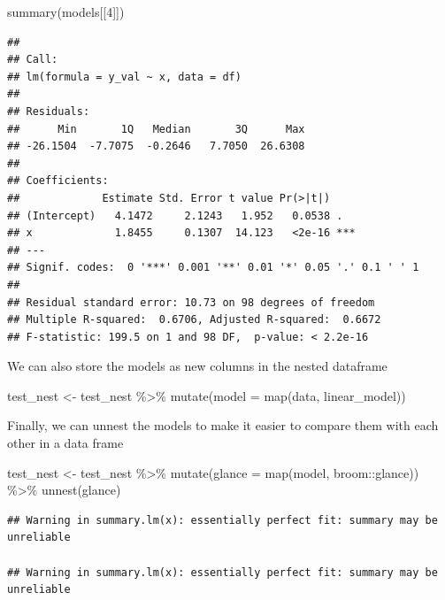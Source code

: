 \documentclass[
]{book}
\newenvironment{Shaded}{\begin{snugshade}}{\end{snugshade}}
\newcommand{\AttributeTok}[1]{\textcolor[rgb]{0.77,0.63,0.00}{#1}}
\newcommand{\DecValTok}[1]{\textcolor[rgb]{0.00,0.00,0.81}{#1}}
\newcommand{\FunctionTok}[1]{\textcolor[rgb]{0.00,0.00,0.00}{#1}}
\newcommand{\NormalTok}[1]{#1}
\newcommand{\OtherTok}[1]{\textcolor[rgb]{0.56,0.35,0.01}{#1}}
\newcommand{\SpecialCharTok}[1]{\textcolor[rgb]{0.00,0.00,0.00}{#1}}
\begin{document}
\begin{Shaded}
\begin{Highlighting}[]
\FunctionTok{summary}\NormalTok{(models[[}\DecValTok{4}\NormalTok{]])}
\end{Highlighting}
\end{Shaded}

\begin{verbatim}
## 
## Call:
## lm(formula = y_val ~ x, data = df)
## 
## Residuals:
##      Min       1Q   Median       3Q      Max 
## -26.1504  -7.7075  -0.2646   7.7050  26.6308 
## 
## Coefficients:
##             Estimate Std. Error t value Pr(>|t|)    
## (Intercept)   4.1472     2.1243   1.952   0.0538 .  
## x             1.8455     0.1307  14.123   <2e-16 ***
## ---
## Signif. codes:  0 '***' 0.001 '**' 0.01 '*' 0.05 '.' 0.1 ' ' 1
## 
## Residual standard error: 10.73 on 98 degrees of freedom
## Multiple R-squared:  0.6706, Adjusted R-squared:  0.6672 
## F-statistic: 199.5 on 1 and 98 DF,  p-value: < 2.2e-16
\end{verbatim}

We can also store the models as new columns in the nested dataframe

\begin{Shaded}
\begin{Highlighting}[]
\NormalTok{test\_nest }\OtherTok{\textless{}{-}}\NormalTok{ test\_nest }\SpecialCharTok{\%\textgreater{}\%} 
  \FunctionTok{mutate}\NormalTok{(}\AttributeTok{model =} \FunctionTok{map}\NormalTok{(data, linear\_model))}
\end{Highlighting}
\end{Shaded}

Finally, we can unnest the models to make it easier to compare them with each other in a data frame

\begin{Shaded}
\begin{Highlighting}[]
\NormalTok{test\_nest }\OtherTok{\textless{}{-}}\NormalTok{ test\_nest }\SpecialCharTok{\%\textgreater{}\%} 
  \FunctionTok{mutate}\NormalTok{(}\AttributeTok{glance =} \FunctionTok{map}\NormalTok{(model, broom}\SpecialCharTok{::}\NormalTok{glance)) }\SpecialCharTok{\%\textgreater{}\%} 
  \FunctionTok{unnest}\NormalTok{(glance)}
\end{Highlighting}
\end{Shaded}

\begin{verbatim}
## Warning in summary.lm(x): essentially perfect fit: summary may be unreliable

## Warning in summary.lm(x): essentially perfect fit: summary may be unreliable
\end{verbatim}
\end{document}
